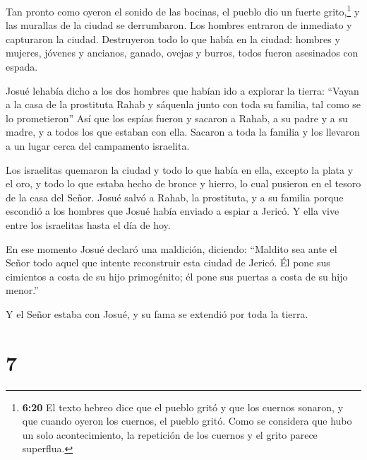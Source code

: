  Tan pronto como oyeron el sonido de las bocinas, el pueblo
dio un fuerte grito,\footnote{\textbf{6:20} El texto hebreo dice que el
  pueblo gritó y que los cuernos sonaron, y que cuando oyeron los
  cuernos, el pueblo gritó. Como se considera que hubo un solo
  acontecimiento, la repetición de los cuernos y el grito parece
  superflua.} y las murallas de la ciudad se derrumbaron. Los hombres
entraron de inmediato y capturaron la ciudad.  Destruyeron
todo lo que había en la ciudad: hombres y mujeres, jóvenes y ancianos,
ganado, ovejas y burros, todos fueron asesinados con espada.

 Josué lehabía dicho a los dos hombres que habían ido a
explorar la tierra: ``Vayan a la casa de la prostituta Rahab y sáquenla
junto con toda su familia, tal como se lo prometieron'' 
Así que los espías fueron y sacaron a Rahab, a su padre y a su madre, y
a todos los que estaban con ella. Sacaron a toda la familia y los
llevaron a un lugar cerca del campamento israelita.

 Los israelitas quemaron la ciudad y todo lo que había en
ella, excepto la plata y el oro, y todo lo que estaba hecho de bronce y
hierro, lo cual pusieron en el tesoro de la casa del Señor.
 Josué salvó a Rahab, la prostituta, y a su familia porque
escondió a los hombres que Josué había enviado a espiar a Jericó. Y ella
vive entre los israelitas hasta el día de hoy.

 En ese momento Josué declaró una maldición, diciendo:
``Maldito sea ante el Señor todo aquel que intente reconstruir esta
ciudad de Jericó. Él pone sus cimientos a costa de su hijo primogénito;
él pone sus puertas a costa de su hijo menor.''

 Y el Señor estaba con Josué, y su fama se extendió por
toda la tierra.

\hypertarget{section-6}{%
\section{7}\label{section-6}}

